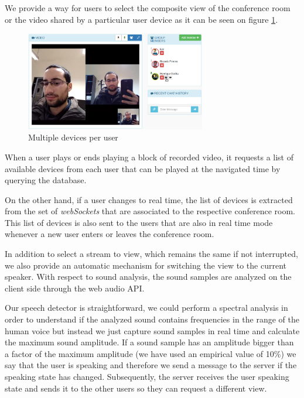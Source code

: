 		We provide a way for users to select the composite view of the conference room or the video shared by a particular user device as it can be seen on figure \ref{fig:devices}. 
	
	\begin{figure}
		\centering
		\includegraphics[width=0.7\textwidth]{figures/devices.png}
		\caption{Multiple devices per user}
		\label{fig:devices}
	\end{figure}


		When a user plays or ends playing a block of recorded video, it requests a list of available devices from each user that can be played at the navigated time by querying the database.

		On the other hand, if a user changes to real time, the list of devices is extracted from the set of \emph{webSockets} that are associated to the respective conference room. This list of devices is also sent to the users that are also in real time mode whenever a new user enters or leaves the conference room.

		In addition to select a stream to view, which remains the same if not interrupted, we also provide an automatic mechanism for switching the view to the current speaker. With respect to sound analysis, the sound samples are analyzed on the client side through the web audio \ac{API}.

		Our speech detector is straightforward, we could perform a spectral analysis in order to understand if the analyzed sound contains frequencies in the range of the human voice but instead we just capture sound samples in real time and calculate the maximum sound amplitude. If a sound sample has an amplitude bigger than a factor of the maximum amplitude (we have used an empirical value of 10\%) we say that the user is speaking and therefore we send a message to the server if the speaking state has changed. Subsequently, the server receives the user speaking state and sends it to the other users so they can request a different view.

